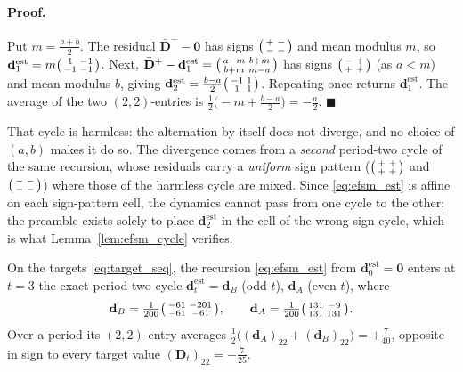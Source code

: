 \paragraph{Proof.}
Put $m=\tfrac{a+b}2$. The residual $\bar{\mathbf D}^{-}-\mathbf 0$ has signs
$\bigl(\begin{smallmatrix}+&-\\-&-\end{smallmatrix}\bigr)$ and mean modulus $m$, so
$\mathbf d_1^{\mathrm{est}}=m\bigl(\begin{smallmatrix}1&-1\\-1&-1\end{smallmatrix}\bigr)$. Next,
$\bar{\mathbf D}^{+}-\mathbf d_1^{\mathrm{est}}
=\bigl(\begin{smallmatrix}a-m&b+m\\b+m&m-a\end{smallmatrix}\bigr)$ has signs $\bigl(\begin{smallmatrix}-&+\\+&+\end{smallmatrix}\bigr)$ (as $a<m$) and mean
modulus $b$, giving $\mathbf d_2^{\mathrm{est}}=\tfrac{b-a}2\bigl(\begin{smallmatrix}-1&1\\1&1\end{smallmatrix}\bigr)$.
Repeating once returns $\mathbf d_1^{\mathrm{est}}$. The average of the two
$(2,2)$-entries is $\tfrac12\bigl(-m+\tfrac{b-a}2\bigr)=-\tfrac a2$.
$\blacksquare$

That cycle is harmless: the alternation by itself does not diverge, and no
choice of $(a,b)$ makes it do so. The divergence comes from a \emph{second}
period-two cycle of the same recursion, whose residuals carry a \emph{uniform}
sign pattern
($\bigl(\begin{smallmatrix}+&+\\+&+\end{smallmatrix}\bigr)$ and $\bigl(\begin{smallmatrix}-&-\\-&-\end{smallmatrix}\bigr)$) where those of the harmless
cycle are mixed. Since \eqref{eq:efsm_est} is affine on each sign-pattern
cell, the dynamics cannot pass from one cycle to the other; the preamble
exists solely to place $\mathbf d_2^{\mathrm{est}}$ in the cell of the
wrong-sign cycle, which is what Lemma~\ref{lem:efsm_cycle} verifies.

\begin{lemma}\label{lem:efsm_cycle}
On the targets \eqref{eq:target_seq}, the recursion \eqref{eq:efsm_est} from
$\mathbf d_0^{\mathrm{est}}=\mathbf 0$ enters at $t=3$ the exact period-two cycle
$\mathbf d_t^{\mathrm{est}}=\mathbf d_B$ (odd $t$), $\mathbf d_A$ (even $t$),
where
\begin{equation}\label{eq:dcycle}
\mathbf d_B=\tfrac1{200}\bigl(\begin{smallmatrix}-61&-201\\-61&-61\end{smallmatrix}\bigr),\qquad
\mathbf d_A=\tfrac1{200}\bigl(\begin{smallmatrix}131&-9\\131&131\end{smallmatrix}\bigr).
\end{equation}
Over a period its $(2,2)$-entry averages
$\tfrac12\bigl((\mathbf d_A)_{22}+(\mathbf d_B)_{22}\bigr)
=+\tfrac7{40}$, opposite in sign to every target value
$(\mathbf D_t)_{22}=-\tfrac7{25}$.
\end{lemma}
